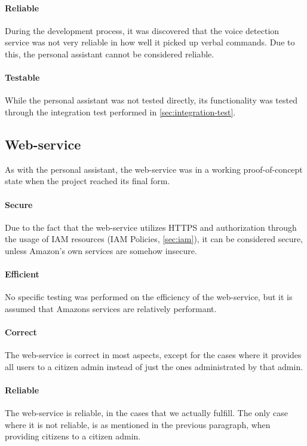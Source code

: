 \paragraph{Reliable}
During the development process, it was discovered that the voice detection service was not very reliable in how well it picked up verbal commands. Due to this, the personal assistant cannot be considered reliable.

\paragraph{Testable}
While the personal assistant was not tested directly, its functionality was tested through the integration test performed in \ref{sec:integration-test}.



\subsection{Web-service}
As with the personal assistant, the web-service was in a working proof-of-concept state when the project reached its final form.
\paragraph{Secure}
Due to the fact that the web-service utilizes HTTPS and authorization through the usage of IAM resources (IAM Policies, \ref{sec:iam}), it can be considered secure, unless Amazon's own services are somehow insecure.

\paragraph{Efficient}
No specific testing was performed on the efficiency of the web-service, but it is assumed that Amazons services are relatively performant.%

\paragraph{Correct}
The web-service is correct in most aspects, except for the cases where it provides all users to a citizen admin instead of just the ones administrated by that admin. 

\paragraph{Reliable}
The web-service is reliable, in the cases that we actually fulfill. The only case where it is not reliable, is as mentioned in the previous paragraph, when providing citizens to a citizen admin.

